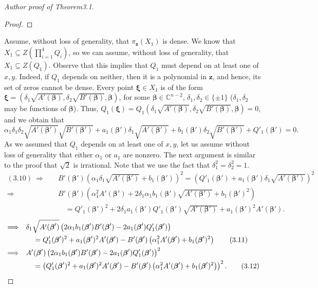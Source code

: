 \documentclass[10pt,a4paper]{article}
\begin{document}
\begin{proof}[Author proof of Theorem3.1]
\begin{proof}
\end{proof}
Assume, without loss of generality, that $\pi_{\mathbf z}(X_1)$ is dense. We know that $X_1\subseteq Z(\prod_{i=1}^4Q_i)$, so we can assume, without loss of generality, that $X_1\subseteq Z(Q_1)$. Observe that this implies that $Q_1$ must depend on at least one of $x,y$. Indeed, if $Q_1$ depends on neither, then it is a polynomial in $\mathbf z$, and hence, its set of zeros cannot be dense.
Every point $\boldsymbol\xi\in X_1$ is of the form $\boldsymbol\xi=(\delta_1\sqrt{A'(\boldsymbol\beta)},\delta_2\sqrt{B'(\boldsymbol\beta)},\boldsymbol\beta)$, for some $\boldsymbol\beta\in\mathbb C^{n-2}$, $\delta_1,\delta_2\in\{\pm1\}$ ($\delta_1,\delta_2$ may be functions of $\boldsymbol\beta$). Thus, $Q_1(\boldsymbol\xi)=Q_1(\delta_1\sqrt{A'(\boldsymbol\beta)},\delta_2\sqrt{B'(\boldsymbol\beta)},\boldsymbol\beta)=0$, and we obtain that
\begin{equation}\alpha_1\delta_1\delta_2\sqrt{A'(\boldsymbol\beta')}\sqrt{B'(\boldsymbol\beta')}+a_1(\boldsymbol\beta')\delta_1\sqrt{A'(\boldsymbol\beta')}+b_1(\boldsymbol\beta')\delta_2\sqrt{B'(\boldsymbol\beta')}+Q'_1(\boldsymbol\beta')=0.\tag{3.10}\end{equation}
As we assumed that $Q_1$ depends on at least one of $x,y$, let us assume without loss of generality that either $\alpha_1$ or $a_1$ are nonzero. The next argument is similar to the proof that $\sqrt2$ is irrational. Note that we use the fact that $\delta_1^2=\delta_2^2=1$.
\begin{align*}(3.10)\ \Longrightarrow\quad&B'(\boldsymbol\beta')\left(\alpha_1\delta_1\sqrt{A'(\boldsymbol\beta')}+b_1(\boldsymbol\beta')\right)^2=\left(Q'_1(\boldsymbol\beta')+a_1(\boldsymbol\beta')\delta_1\sqrt{A'(\boldsymbol\beta')}\right)^2\\\Longrightarrow\quad&B'(\boldsymbol\beta')\left(\alpha_1^2A'(\boldsymbol\beta')+2\delta_1\alpha_1b_1(\boldsymbol\beta')\sqrt{A'(\boldsymbol\beta')}+b_1(\boldsymbol\beta')^2\right)\\&\quad=Q'_1(\boldsymbol\beta')^2+2\delta_1a_1(\boldsymbol\beta')Q'_1(\boldsymbol\beta')\sqrt{A'(\boldsymbol\beta')}+a_1(\boldsymbol\beta')^2A'(\boldsymbol\beta').\end{align*}
\begin{align}\Longrightarrow\quad&\delta_1\sqrt{A'(\boldsymbol\beta')}\left(2\alpha_1b_1(\boldsymbol\beta')B'(\boldsymbol\beta')-2a_1(\boldsymbol\beta')Q'_1(\boldsymbol\beta')\right)\notag\\&\quad=Q'_1(\boldsymbol\beta')^2+a_1(\boldsymbol\beta')^2A'(\boldsymbol\beta')-B'(\boldsymbol\beta')\left(\alpha_1^2A'(\boldsymbol\beta')+b_1(\boldsymbol\beta')^2\right)\tag{3.11}\\\Longrightarrow\quad&A'(\boldsymbol\beta')\left(2\alpha_1b_1(\boldsymbol\beta')B'(\boldsymbol\beta')-2a_1(\boldsymbol\beta')Q'_1(\boldsymbol\beta')\right)^2\notag\\&\quad=\left(Q'_1(\boldsymbol\beta')^2+a_1(\boldsymbol\beta')^2A'(\boldsymbol\beta')-B'(\boldsymbol\beta')\left(\alpha_1^2A'(\boldsymbol\beta')+b_1(\boldsymbol\beta')^2\right)\right)^2.\tag{3.12}\end{align}

\end{proof}
\end{document}
